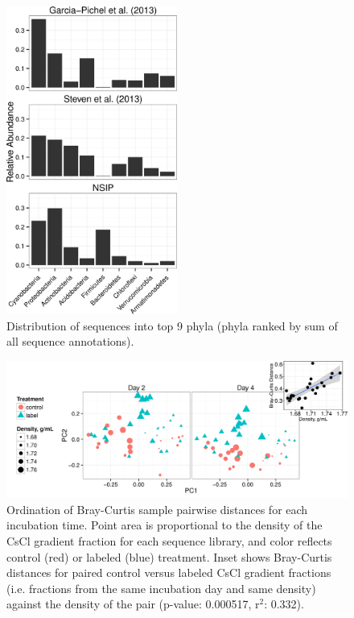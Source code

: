 

\begin{figure}[h!]
  \centering
    \includegraphics[width=0.5\textwidth]{figures/study_phylum_dist/study_phylum_dist.png}
  \caption{Distribution of sequences into top 9 phyla (phyla ranked by sum of all sequence annotations).}
  \label{fig:study_phy_dist}
\end{figure}

\begin{figure}[h!]
  \centering
  \includegraphics[width=1.0\textwidth]{figures/ordination_all_day_facet/ordination_day_facet_w_inset.png}
  \caption{Ordination of Bray-Curtis sample pairwise distances for each incubation time. Point area is proportional to the density of the CsCl gradient fraction for each sequence library, and color reflects control (red) or labeled (blue) treatment. Inset shows Bray-Curtis distances for paired control versus labeled CsCl gradient fractions (i.e. fractions from the same incubation day and same density) against the density of the pair (p-value: 0.000517, r$^{2}$: 0.332).}
  \label{fig:ordination}
\end{figure}

